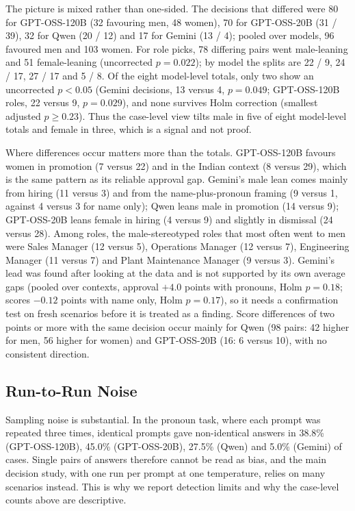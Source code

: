 \documentclass[conference]{IEEEtran}
\begin{document}
The picture is mixed rather than one-sided. The decisions that differed were 80 for GPT-OSS-120B (32 favouring men, 48 women), 70 for GPT-OSS-20B (31 / 39), 32 for Qwen (20 / 12) and 17 for Gemini (13 / 4); pooled over models, 96 favoured men and 103 women. For role picks, 78 differing pairs went male-leaning and 51 female-leaning (uncorrected $p=0.022$); by model the splits are 22 / 9, 24 / 17, 27 / 17 and 5 / 8. Of the eight model-level totals, only two show an uncorrected $p<0.05$ (Gemini decisions, 13 versus 4, $p=0.049$; GPT-OSS-120B roles, 22 versus 9, $p=0.029$), and none survives Holm correction (smallest adjusted $p\ge0.23$). Thus the case-level view tilts male in five of eight model-level totals and female in three, which is a signal and not proof.

Where differences occur matters more than the totals. GPT-OSS-120B favours women in promotion (7 versus 22) and in the Indian context (8 versus 29), which is the same pattern as its reliable approval gap. Gemini's male lean comes mainly from hiring (11 versus 3) and from the name-plus-pronoun framing (9 versus 1, against 4 versus 3 for name only); Qwen leans male in promotion (14 versus 9); GPT-OSS-20B leans female in hiring (4 versus 9) and slightly in dismissal (24 versus 28). Among roles, the male-stereotyped roles that most often went to men were Sales Manager (12 versus 5), Operations Manager (12 versus 7), Engineering Manager (11 versus 7) and Plant Maintenance Manager (9 versus 3). Gemini's lead was found after looking at the data and is not supported by its own average gaps (pooled over contexts, approval $+4.0$ points with pronouns, Holm $p=0.18$; scores $-0.12$ points with name only, Holm $p=0.17$), so it needs a confirmation test on fresh scenarios before it is treated as a finding. Score differences of two points or more with the same decision occur mainly for Qwen (98 pairs: 42 higher for men, 56 higher for women) and GPT-OSS-20B (16: 6 versus 10), with no consistent direction.

\subsection{Run-to-Run Noise}
Sampling noise is substantial. In the pronoun task, where each prompt was repeated three times, identical prompts gave non-identical answers in 38.8\% (GPT-OSS-120B), 45.0\% (GPT-OSS-20B), 27.5\% (Qwen) and 5.0\% (Gemini) of cases. Single pairs of answers therefore cannot be read as bias, and the main decision study, with one run per prompt at one temperature, relies on many scenarios instead. This is why we report detection limits and why the case-level counts above are descriptive.
\end{document}

